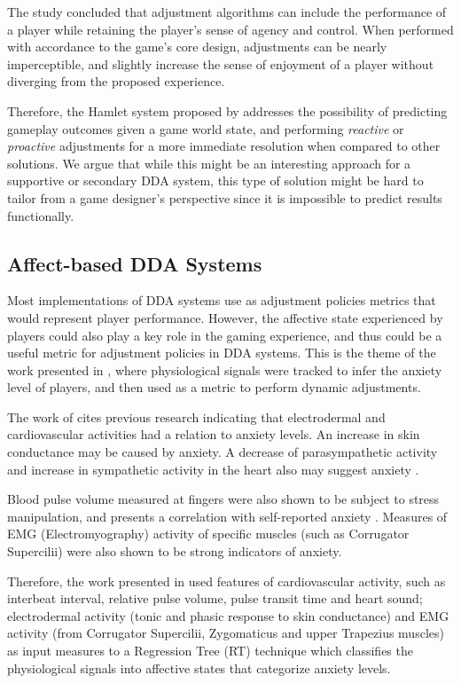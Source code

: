 \documentclass[cic,tc,english]{iiufrgs}
\begin{document}
The study concluded that adjustment algorithms can include the performance of a player while retaining the player's sense of agency and control. When performed with accordance to the game's core design, adjustments can be nearly imperceptible, and slightly increase the sense of enjoyment of a player without diverging from the proposed experience.

Therefore, the Hamlet system proposed by \citet{article_casefordynamicdifficulty} addresses the possibility of predicting gameplay outcomes given a game world state, and performing \emph{reactive} or \emph{proactive} adjustments for a more immediate resolution when compared to other solutions. We argue that while this might be an interesting approach for a supportive or secondary DDA system, this type of solution might be hard to tailor from a game designer's perspective since it is impossible to predict results functionally.

\subsection{Affect-based DDA Systems}

Most implementations of DDA systems use as adjustment policies metrics that would represent player performance. However, the affective state experienced by players could also play a key role in the gaming experience, and thus could be a useful metric for adjustment policies in DDA systems. This is the theme of the work presented in \cite{article_affectivedda}, where physiological signals were tracked to infer the anxiety level of players, and then used as a metric to perform dynamic adjustments.

The work of \citet{article_affectivedda} cites previous research indicating that electrodermal and cardiovascular activities had a relation to anxiety levels. An increase in skin conductance may be caused by anxiety. A decrease of parasympathetic activity and increase in sympathetic activity in the heart also may suggest anxiety \cite{article_affectivedda}.

Blood pulse volume measured at fingers were also shown to be subject to stress manipulation, and presents a correlation with self-reported anxiety \cite{article_affectivedda}. Measures of EMG (Electromyography) activity of specific muscles (such as Corrugator Supercilii) were also shown to be strong indicators of anxiety.

Therefore, the work presented in \cite{article_affectivedda} used features of cardiovascular activity, such as interbeat interval, relative pulse volume, pulse transit time and heart sound; electrodermal activity (tonic and phasic response to skin conductance) and EMG activity (from Corrugator Supercilii, Zygomaticus and upper Trapezius muscles) as input measures to a Regression Tree (RT) technique which classifies the physiological signals into affective states that categorize anxiety levels.
\end{document}
